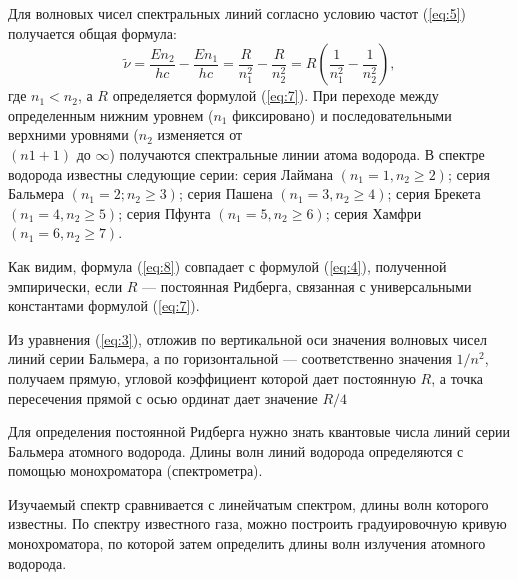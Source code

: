 \documentclass[12pt]{article}
\let\oldref\ref
\renewcommand{\ref}[1]{(\oldref{#1})}
\begin{document}
    Для волновых чисел спектральных линий согласно условию частот \ref{eq:5} получается общая формула:
    \begin{equation}
        \label{eq:8}
            \widetilde{\nu} = \frac{E n_2}{hc} - \frac{E n_1}{hc} = \frac{R}{n^2_1} - \frac{R}{n^2_2} = R \left( \frac{1}{n^2_1} - \frac{1}{n^2_2} \right),
    \end{equation}
    где $ n_1 < n_2 $, а $ R $ определяется  формулой  \ref{eq:7}.  При  переходе  между  определенным  нижним уровнем ($ n_1 $ фиксировано) и последовательными верхними уровнями ($ n_2 $ изменяется от \\ $ (n1+1) $ до $ \infty $)  получаются  спектральные  линии  атома  водорода.  В  спектре  водорода  известны следующие серии: серия Лаймана $ (n_1=1, n_2 \geq 2) $; серия Бальмера $ (n_1=2; n_2 \geq 3) $; серия Пашена $ (n_1=3, n_2 \geq 4) $; серия Брекета $ (n_1=4, n_2 \geq 5) $; серия Пфунта $ (n_1=5, n_2 \geq 6) $; серия Хамфри $ (n_1=6, n_2 \geq 7) $.

    Как  видим,  формула  \ref{eq:8}  совпадает  с  формулой  \ref{eq:4},  полученной  эмпирически,  если $ R $ --- постоянная Ридберга, связанная с универсальными константами формулой \ref{eq:7}.

    Из уравнения \ref{eq:3}, отложив по вертикальной оси значения волновых чисел линий серии Бальмера,  а  по  горизонтальной --- соответственно  значения $ 1/n^2 $,  получаем  прямую,  угловой коэффициент которой дает постоянную $ R $, а точка пересечения прямой с осью ординат дает значение $ R/4 $

    Для  определения  постоянной  Ридберга  нужно знать квантовые  числа  линий  серии  Бальмера  атомного  водорода. Длины волн линий водорода определяются с помощью монохроматора (спектрометра).
    
    Изучаемый   спектр   сравнивается   с   линейчатым спектром,  длины  волн  которого  известны.  По  спектру известного  газа, можно построить градуировочную кривую монохроматора, по которой затем определить длины волн излучения атомного водорода.

    \newpage
\end{document}
